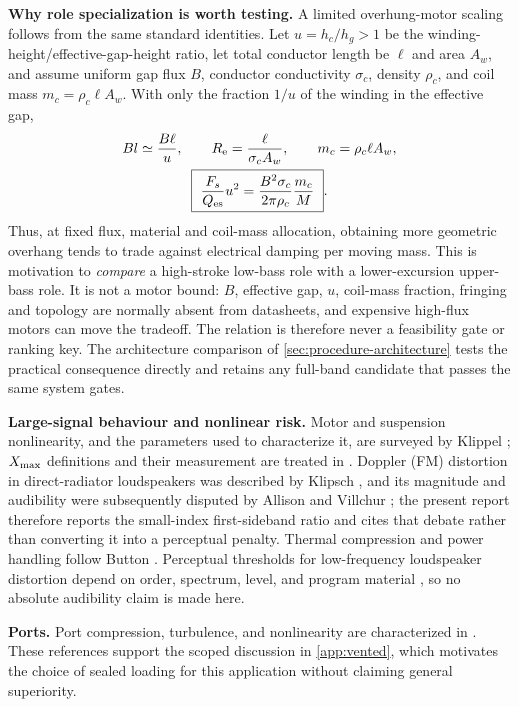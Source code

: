 \textbf{Why role specialization is worth testing.} A limited overhung-motor
scaling follows from the same standard identities. Let $u=h_c/h_g>1$ be
the winding-height/effective-gap-height ratio, let total conductor length
be $\ell$ and area $A_w$, and assume uniform gap flux $B$, conductor
conductivity $\sigma_c$, density $\rho_c$, and coil mass
$m_c=\rho_c\ell A_w$. With only the fraction $1/u$ of the winding in the
effective gap,
\begin{equation}
	\begin{gathered}
		Bl\simeq\frac{B\ell}{u},\qquad
		R_{\mathrm{e}}=\frac{\ell}{\sigma_cA_w},\qquad
		m_c=\rho_c\ell A_w,\\
		\boxed{\ \frac{F_s}{Q_{\mathrm{es}}}u^2
		=\frac{B^2\sigma_c}{2\pi\rho_c}\frac{m_c}{M}\ } .
	\end{gathered}
	\label{eq:motor-scaling}
\end{equation}
Thus, at fixed flux, material and coil-mass allocation, obtaining more
geometric overhang tends to trade against electrical damping per moving
mass. This is motivation to \emph{compare} a high-stroke low-bass role
with a lower-excursion upper-bass role. It is not a motor bound: $B$,
effective gap, $u$, coil-mass fraction, fringing and topology are normally
absent from datasheets, and expensive high-flux motors can move the
tradeoff. The relation is therefore never a feasibility gate or ranking
key. The architecture comparison of \cref{sec:procedure-architecture}
tests the practical consequence directly and retains any full-band
candidate that passes the same system gates.

\textbf{Large-signal behaviour and nonlinear risk.} Motor and suspension
nonlinearity, and the parameters used to characterize it, are surveyed by
Klippel \cite{klippel2006}; $X_{\mathrm{max}}$ definitions and their measurement are
treated in \cite{klippel2003xmax}. Doppler (FM) distortion in
direct-radiator loudspeakers was described by Klipsch \cite{klipsch1969},
and its magnitude and audibility were subsequently disputed by Allison and
Villchur \cite{allison1982}; the present report therefore reports the
small-index first-sideband ratio and cites that debate rather than
converting it into a perceptual penalty. Thermal compression and power
handling follow Button \cite{button1992}. Perceptual thresholds for low-frequency
loudspeaker distortion depend on order, spectrum, level, and program
material \cite{fielder2019}, so no absolute audibility claim is made here.

\textbf{Ports.} Port compression, turbulence, and nonlinearity are
characterized in \cite{salvatti2002,vanderkooy1998}. These references
support the scoped discussion in \cref{app:vented}, which motivates the
choice of sealed loading for this application without claiming general
superiority.

